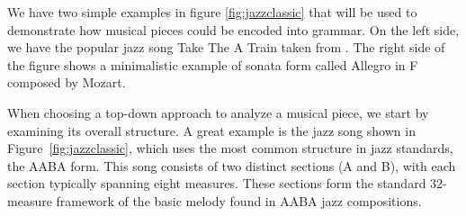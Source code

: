 We have two simple examples in figure \ref{fig:jazzclassic} that will be used to demonstrate how musical pieces could be encoded into grammar. On the left side, we have the popular jazz song Take The A Train taken from \cite{ravelliJazzForm2025}. The right side of the figure \cite{PankhurstSonataForm} shows a minimalistic example of sonata form called Allegro in F composed by Mozart.

When choosing a top-down approach to analyze a musical piece, we start by examining its overall structure. A great example is the jazz song shown in Figure~\ref{fig:jazzclassic}, which uses the most common structure in jazz standards, the AABA form. This song consists of two distinct sections (A and B), with each section typically spanning eight measures. These sections form the standard 32-measure framework of the basic melody found in AABA jazz compositions. 

